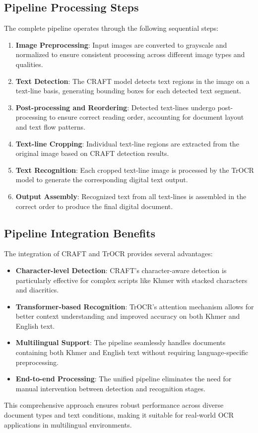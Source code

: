 \subsection{Pipeline Processing Steps}
\label{subsec:pipeline-steps}

The complete pipeline operates through the following sequential steps:

\begin{enumerate}
\item \textbf{Image Preprocessing}: Input images are converted to grayscale and normalized to ensure consistent processing across different image types and qualities.

\item \textbf{Text Detection}: The CRAFT model detects text regions in the image on a text-line basis, generating bounding boxes for each detected text segment.

\item \textbf{Post-processing and Reordering}: Detected text-lines undergo post-processing to ensure correct reading order, accounting for document layout and text flow patterns.

\item \textbf{Text-line Cropping}: Individual text-line regions are extracted from the original image based on CRAFT detection results.

\item \textbf{Text Recognition}: Each cropped text-line image is processed by the TrOCR model to generate the corresponding digital text output.

\item \textbf{Output Assembly}: Recognized text from all text-lines is assembled in the correct order to produce the final digital document.
\end{enumerate}

\subsection{Pipeline Integration Benefits}
\label{subsec:pipeline-benefits}

The integration of CRAFT and TrOCR provides several advantages:

\begin{itemize}
\item \textbf{Character-level Detection}: CRAFT's character-aware detection is particularly effective for complex scripts like Khmer with stacked characters and diacritics.

\item \textbf{Transformer-based Recognition}: TrOCR's attention mechanism allows for better context understanding and improved accuracy on both Khmer and English text.

\item \textbf{Multilingual Support}: The pipeline seamlessly handles documents containing both Khmer and English text without requiring language-specific preprocessing.

\item \textbf{End-to-end Processing}: The unified pipeline eliminates the need for manual intervention between detection and recognition stages.
\end{itemize}

This comprehensive approach ensures robust performance across diverse document types and text conditions, making it suitable for real-world OCR applications in multilingual environments.